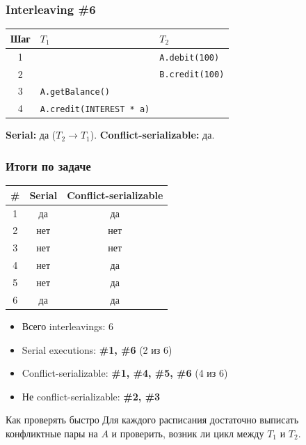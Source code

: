 \documentclass{beamer}
\begin{document}
\begin{frame}
\frametitle{Interleaving \#6}

\vspace{0.5em}
\normalsize
\begin{center}
\begin{tabular}{c|p{}|p{}}
\textbf{Шаг} & \textbf{$T_1$} & \textbf{$T_2$} \\ \hline
1 &  & \texttt{A.debit(100)} \\
2 &  & \texttt{B.credit(100)} \\
3 & \texttt{A.getBalance()} &  \\
4 & \texttt{A.credit(INTEREST * a)} &  \\
\end{tabular}
\end{center}

\vspace{0.4em}
\pause
\textbf{Serial:} да ($T_2 \rightarrow T_1$). \quad
\pause
\textbf{Conflict-serializable:} да.

\end{frame}

\begin{frame}
\frametitle{Итоги по задаче}

\begin{center}
\begin{tabular}{c|c|c}
\textbf{\#} & \textbf{Serial} & \textbf{Conflict-serializable} \\ \hline
1 & да  & да  \\
2 & нет & нет \\
3 & нет & нет \\
4 & нет & да  \\
5 & нет & да  \\
6 & да  & да  \\
\end{tabular}
\end{center}

\vspace{0.4em}
\begin{itemize}
  \item Всего interleavings: $6$
  \item Serial executions: \textbf{\#1, \#6} (2 из 6)
  \item Conflict-serializable: \textbf{\#1, \#4, \#5, \#6} (4 из 6)
  \item Не conflict-serializable: \textbf{\#2, \#3}
\end{itemize}

\begin{block}{Как проверять быстро}
Для каждого расписания достаточно выписать конфликтные пары на $A$ и проверить, возник ли цикл между $T_1$ и $T_2$.
\end{block}

\end{frame}
\end{document}
